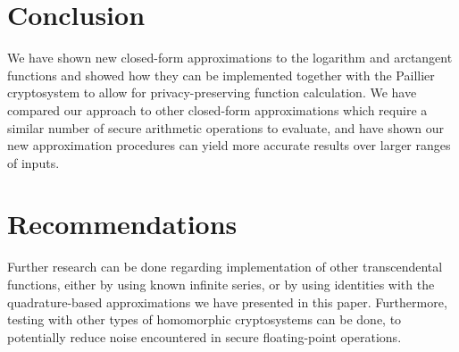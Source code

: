 \section{Conclusion}
We have shown new closed-form approximations to the logarithm and arctangent functions and showed how they can be implemented together with the Paillier cryptosystem to allow for privacy-preserving function calculation. We have compared our approach to other closed-form approximations which require a similar number of secure arithmetic operations to evaluate, and have shown our new approximation procedures can yield more accurate results over larger ranges of inputs.

\section{Recommendations}
Further research can be done regarding implementation of other transcendental functions, either by using known infinite series, or by using identities with the quadrature-based approximations we have presented in this paper. Furthermore, testing with other types of homomorphic cryptosystems can be done, to potentially reduce noise encountered in secure floating-point operations.
